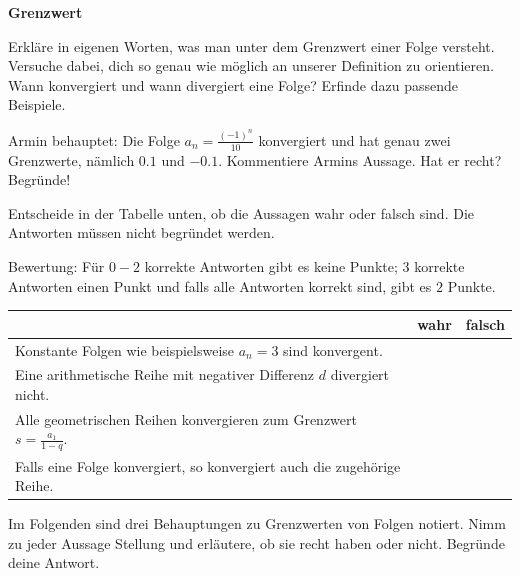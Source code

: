 \documentclass[11pt]{exam}
\newcommand{\theme}{Grenzwert}
\begin{document}
\fontsize{14}{14}\selectfont
\begin{center}
    \huge\bf\theme
\end{center}

\begin{questions}
\question[3]
Erkläre in eigenen Worten, was man unter dem Grenzwert einer Folge versteht. Versuche dabei, dich so genau wie möglich an unserer Definition zu orientieren. Wann  konvergiert und wann divergiert eine Folge? Erfinde dazu passende Beispiele.

\question[4]
Armin behauptet: \flqq Die Folge $\displaystyle a_n=\frac{(-1)^n}{10}$ konvergiert und hat genau zwei Grenzwerte, nämlich $0.1$ und $-0.1$.\frqq\newline
Kommentiere Armins Aussage. Hat er recht? Begründe!

\question[2]
Entscheide in der Tabelle unten, ob die Aussagen wahr oder falsch sind. Die Antworten müssen nicht begründet werden.\newline
\begin{small}
    Bewertung: Für $0-2$ korrekte Antworten gibt es keine Punkte; $3$ korrekte Antworten einen Punkt und falls alle Antworten korrekt sind, gibt es $2$ Punkte.
\end{small}
\begingroup
\renewcommand{\arraystretch}{1.5}
\begin{table}[h]
    \centering
    \begin{tabular}{|p{12cm}|c|c|}\hline
         & wahr & falsch \\\hline
        Konstante Folgen wie beispielsweise $a_n=3$ sind konvergent. & & \\\hline
        Eine arithmetische Reihe mit negativer Differenz $d$ divergiert nicht. & & \\\hline
        Alle geometrischen Reihen konvergieren zum Grenzwert $\displaystyle s=\frac{a_1}{1-q}$. & & \\\hline
        Falls eine Folge konvergiert, so konvergiert auch die zugehörige Reihe. & & \\\hline
    \end{tabular}
\end{table}
\endgroup

\noaddpoints
\question[\totalpoints]
\addpoints
Im Folgenden sind drei Behauptungen zu Grenzwerten von Folgen notiert. Nimm zu jeder Aussage Stellung und erläutere, ob sie recht haben oder nicht. Begründe deine Antwort.
\begin{parts}

\end{parts}
\end{questions}
\end{document}
